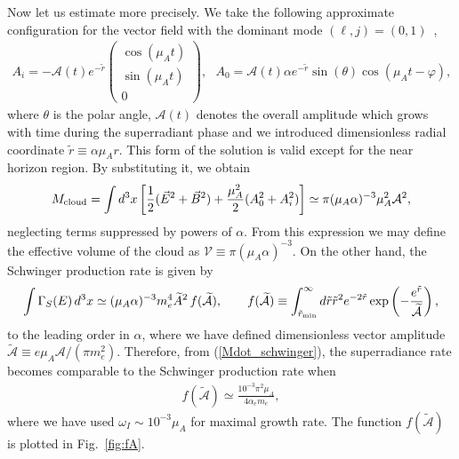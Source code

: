 \documentclass[%
 preprint,
 nofootinbib,
 amsmath,amssymb,
 aps,
 a4paper
]{revtex4-1}
\begin{document}
Now let us estimate more precisely. We take the following approximate configuration for the vector field with the dominant mode $(\ell,j)=(0,1)$~\cite{Baryakhtar:2017ngi},
\begin{align}
	A_i = - \mathcal A(t) e^{-\tilde r} \begin{pmatrix} \cos(\mu_A t) \\ \sin(\mu_A t) \\ 0 \end{pmatrix},~~~
	A_0 = \mathcal A(t) \alpha e^{-\tilde r} \sin(\theta) \cos(\mu_A t-\varphi),
\end{align}
where $\theta$ is the polar angle, $\mathcal A(t)$ denotes the overall amplitude which grows with time during the superradiant phase
and we introduced dimensionless radial coordinate $\tilde r \equiv \alpha\mu_A r$.
This form of the solution is valid except for the near horizon region.
By substituting it, we obtain
\begin{align}
	M_{\rm cloud} =\int d^3 x\left[ \frac{1}{2}(\vec E^2+\vec B^2)+\frac{\mu_A^2}{2} (A_0^2+A_i^2)\right]
	\simeq \pi (\mu_A \alpha)^{-3}\mu_A^2\mathcal A^2,
\end{align}
neglecting terms suppressed by powers of $\alpha$. From this expression we may define the effective volume of the cloud as $\mathcal V \equiv \pi(\mu_A \alpha)^{-3}$.
On the other hand, the Schwinger production rate is given by
\begin{align}
	\int \Gamma_S(E)\,d^3 x \simeq (\mu_A \alpha)^{-3} m_e^4 \widetilde A^2 \, f(\widetilde {\mathcal A}),~~~~~~
	 f(\widetilde {\mathcal A}) \equiv \int_{\tilde r_{\rm min}}^{\infty} d\tilde r \tilde r^2 e^{-2\tilde r}\exp\left(-\frac{e^{\tilde r}}{\widetilde {\mathcal A}} \right),
\end{align}
to the leading order in $\alpha$, where we have defined dimensionless vector amplitude $\widetilde{\mathcal A}\equiv e\mu_A \mathcal A/(\pi m_e^2)$.
Therefore, from (\ref{Mdot_schwinger}), the superradiance rate becomes comparable to the Schwinger production rate when
\begin{align}
	f(\widetilde {\mathcal A}) \simeq \frac{10^{-3} \pi^2 \mu_A}{4\alpha_e m_e},  \label{fA}
\end{align}
where we have used $\omega_I \sim 10^{-3} \mu_A$ for maximal growth rate.
The function $f(\widetilde{\mathcal A})$ is plotted in Fig.~\ref{fig:fA}.
\end{document}
